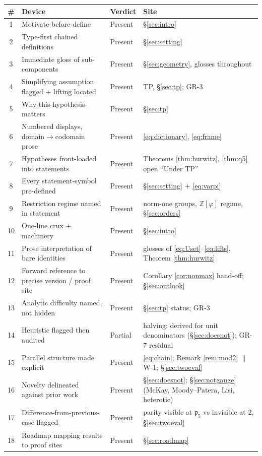 \documentclass[11pt,a4paper]{article}
\theoremstyle{plain}
\theoremstyle{definition}
\theoremstyle{remark}
\newcommand{\Zphi}{\mathbb{Z}[\varphi]}
\newcommand{\pfive}{\mathfrak{p}_5}
\begin{document}
\begin{center}
\small
\begin{tabular}{@{}clll@{}}
\toprule
\# & \textbf{Device} & \textbf{Verdict} & \textbf{Site} \\
\midrule
1 & Motivate-before-define & Present & \S\ref{sec:intro} \\
2 & Type-first chained definitions & Present & \S\ref{sec:setting} \\
3 & Immediate gloss of sub-components & Present & \S\ref{sec:geometry}, glosses throughout \\
4 & Simplifying assumption flagged $+$ lifting located & Present & TP, \S\ref{sec:tp}; GR-3 \\
5 & Why-this-hypothesis-matters & Present & \S\ref{sec:tp} \\
6 & Numbered displays, domain$\to$codomain prose & Present & \eqref{eq:dictionary}, \eqref{eq:frame} \\
7 & Hypotheses front-loaded into statements & Present & Theorems \ref{thm:hurwitz}, \ref{thm:q5} open ``Under TP'' \\
8 & Every statement-symbol pre-defined & Present & \S\ref{sec:setting} $+$ \eqref{eq:varpi} \\
9 & Restriction regime named in statement & Present & norm-one groups, $\Zphi$ regime, \S\ref{sec:orders} \\
10 & One-line crux $+$ machinery & Present & \S\ref{sec:intro} \\
11 & Prose interpretation of bare identities & Present & glosses of \eqref{eq:Uset}--\eqref{eq:lifts}, Theorem \ref{thm:hurwitz} \\
12 & Forward reference to precise version / proof site & Present & Corollary \ref{cor:nonmax} hand-off; \S\ref{sec:outlook} \\
13 & Analytic difficulty named, not hidden & Present & \S\ref{sec:tp} status; GR-3 \\
14 & Heuristic flagged then audited & Partial & halving: derived for unit denominators (\S\ref{sec:doesnot}); GR-7 residual \\
15 & Parallel structure made explicit & Present & \eqref{eq:chain}; Remark \ref{rem:mod2} $\parallel$ W-1; \S\ref{sec:twoeval} \\
16 & Novelty delineated against prior work & Present & \S\ref{sec:doesnot}; \S\ref{sec:notgauge} (McKay, Moody--Patera, Lisi, heterotic) \\
17 & Difference-from-previous-case flagged & Present & parity visible at $\pfive$ vs invisible at $2$, \S\ref{sec:twoeval} \\
18 & Roadmap mapping results to proof sites & Present & \S\ref{sec:roadmap} \\
\bottomrule
\end{tabular}
\end{center}
\end{document}
